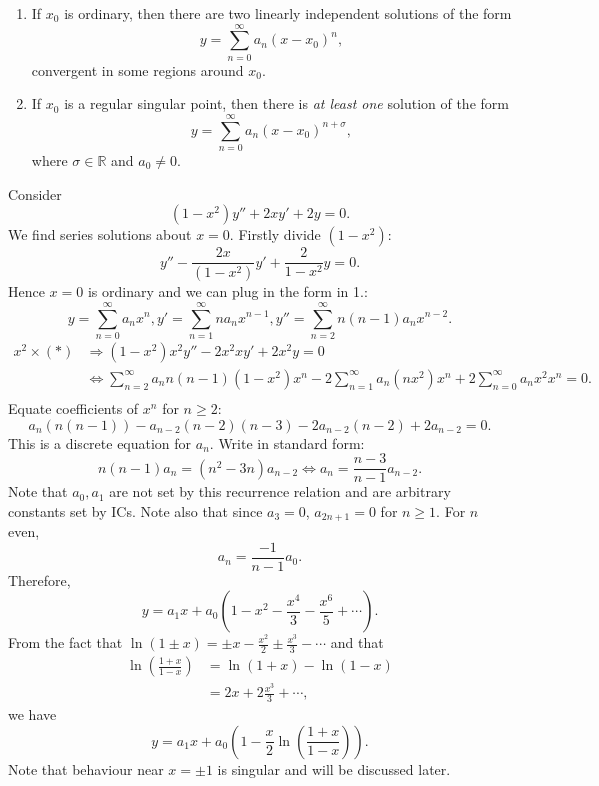 \documentclass[10pt]{article}
\def\ge{\geqslant}
\begin{document}
    \begin{theorem}[Fuch]\label{thm:Fuch}
       \begin{enumerate}
           \item If $x_0$ is ordinary, then there are two linearly independent solutions of the form
           \[
               y=\sum_{n=0}^{\infty} a_n (x-x_0)^n
           ,\]
           convergent in some regions around $x_0$.
           \item If $x_0$ is a regular singular point, then there is \textit{at least one} solution of the form 
           \[
               y=\sum_{n=0}^{\infty}a_n(x-x_0)^{n+\sigma}
           ,\]
           where $ \sigma\in \mathbb{R} $ and $a_0\neq 0$.
       \end{enumerate} 
    \end{theorem}
    \begin{example}
        Consider 
        \[
            (1-x^2)y''+2xy'+2y=0\tag{$*$}
        .\]
        We find series solutions about $x=0$. Firstly divide $(1-x^2)$:
        \[
            y''-\frac{2x}{(1-x^2)}y'+\frac{2}{1-x^2}y=0
        .\]
        Hence $x=0$ is ordinary and we can plug in the form in 1.:
        \[
            y=\sum_{n=0}^{\infty}a_n x^n, y'=\sum_{n=1}^{\infty} na_nx^{n-1}, y''=\sum_{n=2}^{\infty }n(n-1)a_nx^{n-2}
        .\]
        \[
            \begin{aligned}
                x^2 \times (*) &\Longrightarrow (1-x^2)x^2y''-2x^2xy'+2x^2y=0\\
                &\Longleftrightarrow \sum_{n=2}^{\infty}a_nn(n-1)(1-x^2)x^n-2 \sum_{n=1}^{\infty}a_n(nx^2)x^n+2 \sum_{n=0}^{\infty}a_n x^2x^{n}=0.\\
            \end{aligned}
        \]
        Equate coefficients of $x^n$ for $n\ge 2$:
        \[
            a_n(n(n-1))-a_{n-2}(n-2)(n-3)-2a_{n-2}(n-2)+2a_{n-2}=0
        .\]
        This is a discrete equation for $a_n$. Write in standard form:
        \[
            n(n-1)a_n=(n^2-3n)a_{n-2} \Longleftrightarrow a_n = \frac{n-3}{n-1}a_{n-2}
        .\]
        Note that $a_0,a_1$ are not set by this recurrence relation and are arbitrary constants set by ICs. Note also that since $a_3=0$, $a_{2n+1}=0$ for $n\ge 1$. For $n$ even, 
        \[
            a_n=\frac{-1}{n-1}a_0
        .\]
        Therefore,
        \[
            y=a_1x+a_0\left( 1-x^2-\frac{x^4}{3}-\frac{x^6}{5}+\cdots \right)
        .\]
        From the fact that $ \ln (1\pm x) = \pm x-\frac{x^2}{2}\pm \frac{x^3}{3}-\cdots $ and that
        \[
            \begin{aligned}
                 \ln \left( \frac{1+x}{1-x} \right)&= \ln (1+x)-\ln (1-x)\\
                &= 2x+2\frac{x^3}{3}+\cdots,
            \end{aligned}
        \]
        we have 
        \[
            y=a_1 x+a_0\left( 1-\frac{x}{2}\ln \left( \frac{1+x}{1-x} \right) \right)
        .\]
        Note that behaviour near $x=\pm 1$ is singular and will be discussed  later.
    \end{example}
\end{document}
